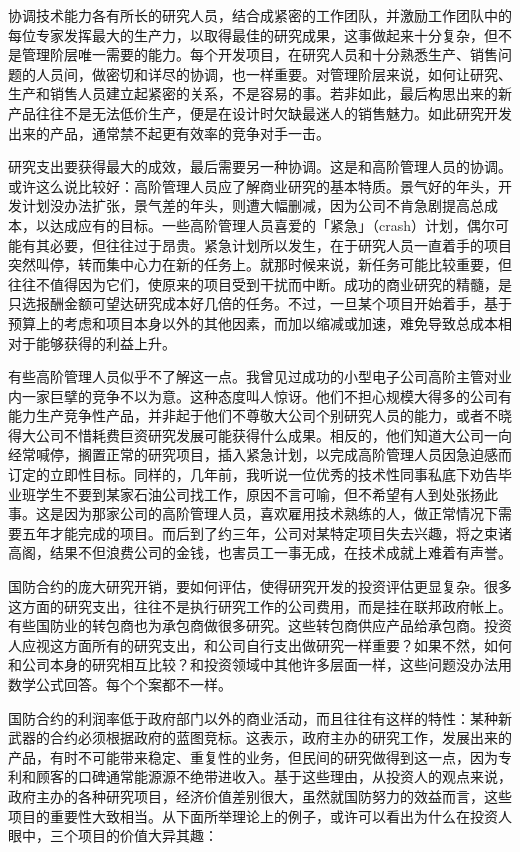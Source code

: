 \documentclass[UTF8,a4paper,zihao=-4,fontset = windows]{ctexart} %
\begin{document}
协调技术能力各有所长的研究人员，结合成紧密的工作团队，并激励工作团队中的每位专家发挥最大的生产力，以取得最佳的研究成果，这事做起来十分复杂，但不是管理阶层唯一需要的能力。每个开发项目，在研究人员和十分熟悉生产、销售问题的人员间，做密切和详尽的协调，也一样重要。对管理阶层来说，如何让研究、生产和销售人员建立起紧密的关系，不是容易的事。若非如此，最后构思出来的新产品往往不是无法低价生产，便是在设计时欠缺最迷人的销售魅力。如此研究开发出来的产品，通常禁不起更有效率的竞争对手一击。

研究支出要获得最大的成效，最后需要另一种协调。这是和高阶管理人员的协调。或许这么说比较好：高阶管理人员应了解商业研究的基本特质。景气好的年头，开发计划没办法扩张，景气差的年头，则遭大幅删减，因为公司不肯急剧提高总成本，以达成应有的目标。一些高阶管理人员喜爱的「紧急」（crash）计划，偶尔可能有其必要，但往往过于昂贵。紧急计划所以发生，在于研究人员一直着手的项目突然叫停，转而集中心力在新的任务上。就那时候来说，新任务可能比较重要，但往往不值得因为它们，使原来的项目受到干扰而中断。成功的商业研究的精髓，是只选报酬金额可望达研究成本好几倍的任务。不过，一旦某个项目开始着手，基于预算上的考虑和项目本身以外的其他因素，而加以缩减或加速，难免导致总成本相对于能够获得的利益上升。

有些高阶管理人员似乎不了解这一点。我曾见过成功的小型电子公司高阶主管对业内一家巨擘的竞争不以为意。这种态度叫人惊讶。他们不担心规模大得多的公司有能力生产竞争性产品，并非起于他们不尊敬大公司个别研究人员的能力，或者不晓得大公司不惜耗费巨资研究发展可能获得什么成果。相反的，他们知道大公司一向经常喊停，搁置正常的研究项目，插入紧急计划，以完成高阶管理人员因急迫感而订定的立即性目标。同样的，几年前，我听说一位优秀的技术性同事私底下劝告毕业班学生不要到某家石油公司找工作，原因不言可喻，但不希望有人到处张扬此事。这是因为那家公司的高阶管理人员，喜欢雇用技术熟练的人，做正常情况下需要五年才能完成的项目。而后到了约三年，公司对某特定项目失去兴趣，将之束诸高阁，结果不但浪费公司的金钱，也害员工一事无成，在技术成就上难着有声誉。

国防合约的庞大研究开销，要如何评估，使得研究开发的投资评估更显复杂。很多这方面的研究支出，往往不是执行研究工作的公司费用，而是挂在联邦政府帐上。有些国防业的转包商也为承包商做很多研究。这些转包商供应产品给承包商。投资人应视这方面所有的研究支出，和公司自行支出做研究一样重要？如果不然，如何和公司本身的研究相互比较？和投资领域中其他许多层面一样，这些问题没办法用数学公式回答。每个个案都不一样。

国防合约的利润率低于政府部门以外的商业活动，而且往往有这样的特性：某种新武器的合约必须根据政府的蓝图竞标。这表示，政府主办的研究工作，发展出来的产品，有时不可能带来稳定、重复性的业务，但民间的研究做得到这一点，因为专利和顾客的口碑通常能源源不绝带进收入。基于这些理由，从投资人的观点来说，政府主办的各种研究项目，经济价值差别很大，虽然就国防努力的效益而言，这些项目的重要性大致相当。从下面所举理论上的例子，或许可以看出为什么在投资人眼中，三个项目的价值大异其趣：
\end{document}
